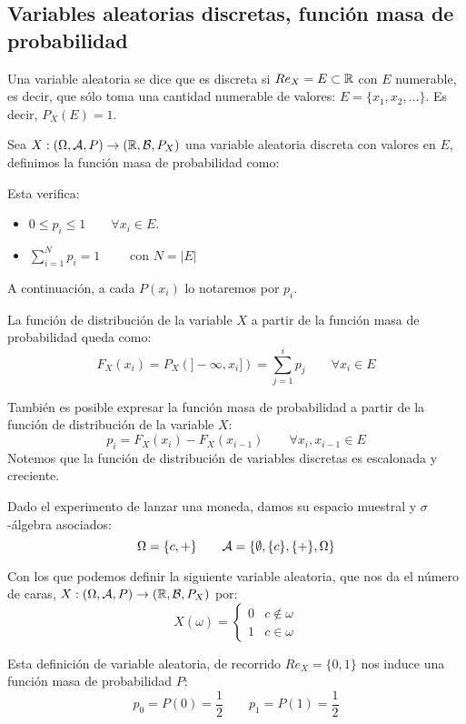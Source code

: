 \subsection{Variables aleatorias discretas, función masa de probabilidad}

\begin{definicion}
    Una variable aleatoria se dice que es discreta si $Re_X = E \subset \mathbb R$ con $E$ numerable, es decir, que sólo toma una cantidad numerable de valores: $E = \{x_1, x_2, \ldots\}$. Es decir, $P_X(E)=1$.
\end{definicion}

\begin{definicion}
    Sea $X: (\Omega, \mathcal{A}, P) \rightarrow (\mathbb R, \mathcal{B}, P_X)$ una variable aleatoria discreta con valores en $E$, definimos la función masa de probabilidad como:
\end{definicion}
Esta verifica:
\begin{itemize}
    \item $0 \leq p_i \leq 1 \qquad \forall x_i \in E$.
    \item $\sum\limits_{i = 1}^N p_i = 1 \qquad $ con $N = |E|$
\end{itemize}
\begin{notacion}
    A continuación, a cada $P(x_i)$ lo notaremos por $p_i$.
\end{notacion}

La función de distribución de la variable $X$ a partir de la función masa de probabilidad queda como:
$$F_X(x_i) = P_X(]-\infty, x_i]) = \sum_{j=1}^i p_j \qquad \forall x_i \in E$$


También es posible expresar la función masa de probabilidad a partir de la función de distribución de la variable $X$:
$$p_i = F_X(x_i) - F_X(x_{i-1}) \qquad \forall x_i,x_{i-1}\in E$$
Notemos que la función de distribución de variables discretas es escalonada y creciente.

\begin{ejemplo}
    Dado el experimento de lanzar una moneda, damos su espacio muestral y $\sigma$-álgebra asociados:
    $$\Omega = \{c, +\} \qquad \mathcal{A}=\{\emptyset, \{c\}, \{+\}, \Omega\}$$
    
    Con los que podemos definir la siguiente variable aleatoria, que nos da el número de caras,
    $X:(\Omega, \mathcal{A}, P) \rightarrow (\mathbb R, \mathcal{B}, P_X)$ por:
    $$X(\omega) = \left\{ \begin{array}{cc}
        0 & c \notin \omega \\
        1 & c \in \omega
    \end{array} \right.$$
    
    Esta definición de variable aleatoria, de recorrido $Re_X = \{0,1\}$ nos induce una función masa de probabilidad $P$:
    $$p_0 = P(0) = \frac{1}{2} \qquad p_1 = P(1) = \frac{1}{2}$$
\end{ejemplo}

